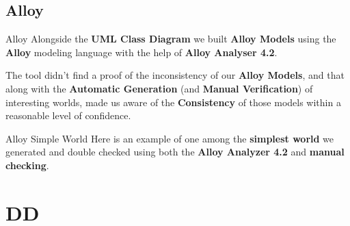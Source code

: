 \documentclass{../common/latex_classes/pdf_presentation}
\begin{document}
	\subsection{Alloy}
	\begin{frame}{Alloy}
		Alongside the \textbf{UML Class Diagram} we built \textbf{Alloy Models} using the \textbf{Alloy} modeling language with the help of \textbf{Alloy Analyser 4.2}.\par
		The tool didn't find a proof of the inconsistency of our \textbf{Alloy Models}, and that along with the \textbf{Automatic Generation} (and \textbf{Manual Verification}) of interesting worlds, made us aware of the \textbf{Consistency} of those models within a reasonable level of confidence.
	\end{frame}
	\begin{frame}{Alloy Simple World}
		Here is an example of one among the \textbf{simplest world} we generated and double checked using both the \textbf{Alloy Analyzer 4.2} and \textbf{manual checking}.
	\end{frame}
	\section{DD}
\end{document}
